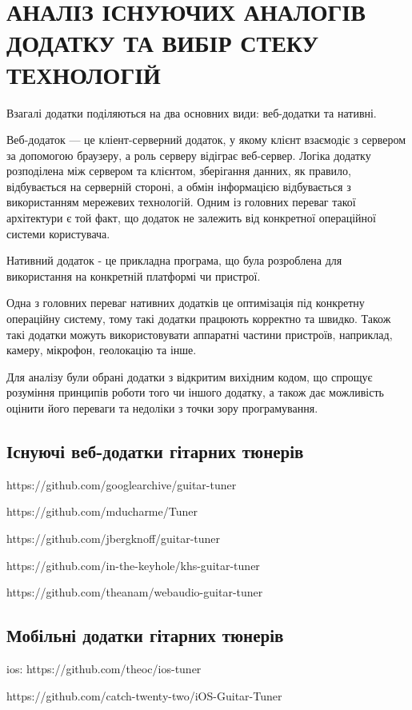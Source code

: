 \section{АНАЛІЗ ІСНУЮЧИХ АНАЛОГІВ ДОДАТКУ ТА ВИБІР СТЕКУ ТЕХНОЛОГІЙ}

Взагалі додатки поділяються на два основних види: веб-додатки та нативні.

Веб-додаток — це кліент-серверний додаток, у якому клієнт взаємодіє з сервером за допомогою браузеру, а роль серверу відіграє веб-сервер. Логіка додатку розподілена між сервером та клієнтом, зберігання данних, як правило, відбувається на серверній стороні, а обмін інформацією відбувається з використанням мережевих технологій. Одним із головних переваг такої архітектури є той факт, що додаток не залежить від конкретної операційної системи користувача.

Нативний додаток - це прикладна програма, що була розроблена для використання на конкретній платформі чи пристрої.

Одна з головних переваг нативних додатків це оптимізація під конкретну операційну систему, тому такі додатки працюють корректно та швидко. Також такі додатки можуть використовувати аппаратні частини пристроїв, наприклад, камеру, мікрофон, геолокацію та інше.

Для аналізу були обрані додатки з відкритим вихідним кодом, що спрощує розуміння принципів роботи того чи іншого додатку, а також дає можливість оцінити його переваги та недоліки з точки зору програмування.

\subsection{Існуючі веб-додатки гітарних тюнерів}

https://github.com/googlearchive/guitar-tuner

https://github.com/mducharme/Tuner

https://github.com/jbergknoff/guitar-tuner

https://github.com/in-the-keyhole/khs-guitar-tuner

https://github.com/theanam/webaudio-guitar-tuner

\subsection{Мобільні додатки гітарних тюнерів}
ios:
https://github.com/theoc/ios-tuner

https://github.com/catch-twenty-two/iOS-Guitar-Tuner

